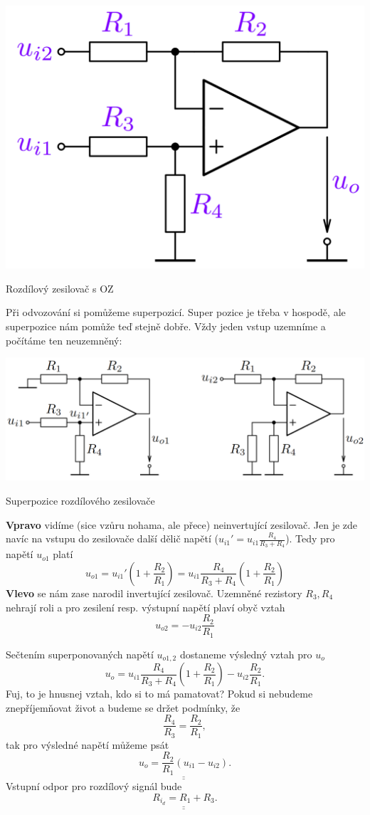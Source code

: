 \documentclass[a4paper,12pt]{article}   %
\begin{document}
\begin{schema}
    \centering
    \includegraphics[height=.3\linewidth]{rozdilovy-zesilovac-oz.PNG}
    \caption{Rozdílový zesilovač s OZ}
    \label{sch:rozdilovy:zesilovac}
\end{schema}

Při odvozování si pomůžeme superpozicí. Super pozice je třeba v hospodě, ale superpozice nám pomůže teď stejně dobře. Vždy jeden vstup uzemníme a počítáme ten neuzemněný:
\begin{schema}
    \centering
    \includegraphics[height=.25\linewidth]{rozdilovy-zesilovac-oz-superpozice.PNG}
    \caption{Superpozice rozdílového zesilovače}
\end{schema}
\textbf{Vpravo} vidíme (sice vzůru nohama, ale přece) neinvertující zesilovač. Jen je zde navíc na vstupu do zesilovače další dělič napětí ($u_{i1}' = u_{i1}\frac{R_4}{R_3 + R_4}$). Tedy pro napětí $u_{o1}$ platí 
\begin{equation*}
    u_{o1} = u_{i1}'\left(1+\frac{R_2}{R_1}\right) = u_{i1}\frac{R_4}{R_3+R_4}\left(1+\frac{R_2}{R_1}\right)
\end{equation*}
\textbf{Vlevo} se nám zase narodil invertující zesilovač. Uzemněné rezistory $R_3, R_4$ nehrají roli a pro zesilení resp. výstupní napětí plaví obyč vztah
\begin{equation*}
    u_{o2} = -u_{i2}\frac{R_2}{R_1}
\end{equation*}

Sečtením superponovaných napětí $u_{o1,2}$ dostaneme výsledný vztah pro $u_o$
\begin{equation}
    u_o = u_{i1}\frac{R_4}{R_3+R_4}\left(1+\frac{R_2}{R_1}\right)-u_{i2}\frac{R_2}{R_1}.
\end{equation}
Fuj, to je hnusnej vztah, kdo si to má pamatovat? Pokud si nebudeme znepříjemňovat život a budeme se držet podmínky, že
\begin{equation*}
    \frac{R_4}{R_3} = \frac{R_2}{R_1},
\end{equation*}
tak pro výsledné napětí můžeme psát
\begin{equation}
    \underline{\underline{u_o = \frac{R_2}{R_1}(u_{i1}-u_{i2})}}.
\end{equation}
Vstupní odpor pro rozdílový signál bude
\begin{equation}
    \underline{\underline{R_{i_d} = R_1 + R_3}}.
\end{equation}
\end{document}
